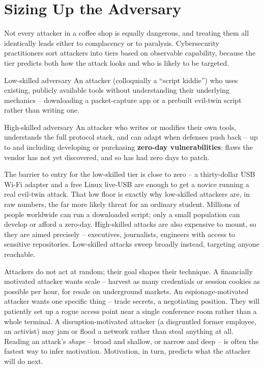 \section{Sizing Up the Adversary}

Not every attacker in a coffee shop is equally dangerous, and treating them all identically
leads either to complacency or to paralysis. Cybersecurity practitioners sort attackers into
tiers based on observable capability, because the tier predicts both how the attack looks and
who is likely to be targeted.

\begin{definition}{Low-skilled adversary}
An attacker (colloquially a ``script kiddie'') who uses existing, publicly available tools
without understanding their underlying mechanics -- downloading a packet-capture app or a
prebuilt evil-twin script rather than writing one.
\end{definition}

\begin{definition}{High-skilled adversary}
An attacker who writes or modifies their own tools, understands the full protocol stack, and can
adapt when defenses push back -- up to and including developing or purchasing
\textbf{zero-day vulnerabilities}: flaws the vendor has not yet discovered, and so has had zero
days to patch.
\end{definition}

The barrier to entry for the low-skilled tier is close to zero -- a thirty-dollar USB Wi-Fi
adapter and a free Linux live-USB are enough to get a novice running a real evil-twin attack.
That low floor is exactly why low-skilled attackers are, in raw numbers, the far more likely
threat for an ordinary student. Millions of people worldwide can run a downloaded script; only a
small population can develop or afford a zero-day. High-skilled attacks are also expensive to
mount, so they are aimed precisely -- executives, journalists, engineers with access to sensitive
repositories. Low-skilled attacks sweep broadly instead, targeting anyone reachable.

\begin{example}
Attackers do not act at random; their goal shapes their technique. A financially motivated
attacker wants scale -- harvest as many credentials or session cookies as possible per hour, for
resale on underground markets. An espionage-motivated attacker wants one specific thing --
trade secrets, a negotiating position. They will patiently set up a rogue access point near a
single conference room rather than a whole terminal. A disruption-motivated attacker (a
disgruntled former employee, an activist) may jam or flood a network rather than steal anything
at all. Reading an attack's \emph{shape} -- broad and shallow, or narrow and deep -- is often
the fastest way to infer motivation. Motivation, in turn, predicts what the attacker will do
next.
\end{example}

